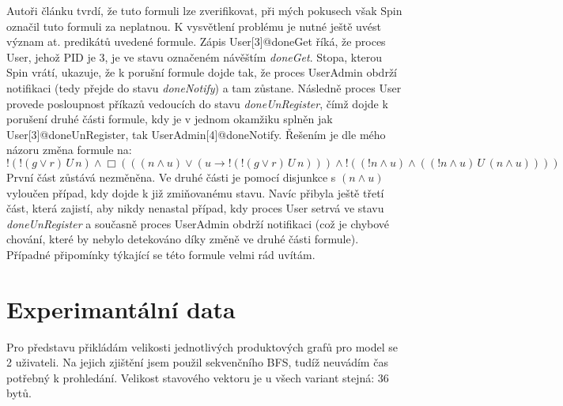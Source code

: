 \documentclass[a4paper]{article}
\begin{document}
Autoři článku tvrdí, že tuto formuli lze zverifikovat, při mých pokusech však Spin označil tuto formuli za neplatnou. K vysvětlení problému je
nutné ještě uvést význam at. predikátů uvedené formule. Zápis User[3]@doneGet říká, že proces User, jehož PID je 3, je ve stavu označeném
návěštím \emph{doneGet}. Stopa, kterou Spin vrátí, ukazuje, že k porušní formule dojde tak, že proces UserAdmin obdrží notifikaci (tedy přejde do
stavu \emph{doneNotify}) a tam zůstane. Následně proces User provede posloupnost příkazů vedoucích do stavu \emph{doneUnRegister}, čímž dojde k porušení
druhé části formule, kdy je v jednom okamžiku splněn jak User[3]@doneUnRegister, tak UserAdmin[4]@doneNotify. Řešením je dle mého názoru
změna formule na:
\[
!(!(g\vee r)\,U\,n)\wedge \Box(((n\wedge u) \vee (u \rightarrow !(!(g\vee r)\,U\,n)))\wedge !((!n\wedge u)\wedge ((!n\wedge u)\,U\,(n\wedge u))))
\]
První část zůstává nezměněna. Ve druhé části je pomocí disjunkce s $(n \wedge u)$ vyloučen případ, kdy dojde k již zmiňovanému 
stavu. Navíc přibyla ještě třetí část, která zajistí, aby nikdy nenastal případ, kdy proces User setrvá ve stavu \emph{doneUnRegister} a
současně proces UserAdmin obdrží notifikaci (což je chybové chování, které by nebylo detekováno díky změně ve druhé části formule). Případné
připomínky týkající se této formule velmi rád uvítám. 


\section{Experimantální data}
Pro představu přikládám velikosti jednotlivých produktových grafů pro model se 2 uživateli. Na jejich zjištění jsem použil sekvenčního BFS,
tudíž neuvádím čas potřebný k prohledání. Velikost stavového vektoru je u všech variant stejná: 36 bytů.
\vspace*{1cm}
\end{document}
